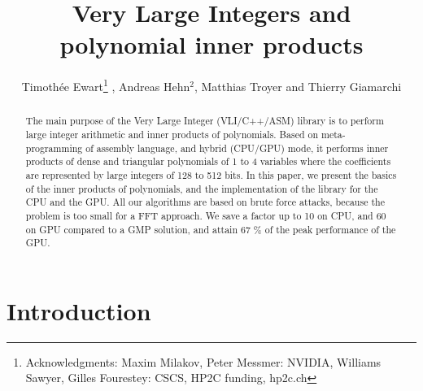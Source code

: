 \documentclass[oribibl]{llncs2e/llncs}
\title{Very Large Integers  and polynomial inner products}
\author{Timoth\'ee Ewart\inst{1}\thanks{Acknowledgments: Maxim Milakov, Peter Messmer:   NVIDIA,   Williams Sawyer, Gilles Fourestey:  CSCS, HP2C funding, hp2c.ch}  , Andreas Hehn$^2$, Matthias Troyer\inst{2} and Thierry Giamarchi\inst{1}}
\institute{Universit\'e de Gen\`eve, \email{timothee.ewart@gmail.com}  \and Eidgen\"ossische Technische Hochschule Z\"urich }
\begin{document}
\maketitle
\begin{abstract}
The main purpose of the  Very Large Integer (VLI/C++/ASM) library is to perform large integer arithmetic and  inner products of polynomials. Based on meta-programming of assembly language,
and  hybrid (CPU/GPU) mode, it performs inner products of dense and triangular polynomials  of 1 to 4 variables  where the coefficients are represented  by large integers of 128 to 512 bits. 
In this paper, we present the basics of the inner products of polynomials, and  the implementation of the library for the CPU and the GPU.  All our algorithms are based on brute force attacks, because the problem is too small for a FFT approach. We save a factor up to 10 on CPU, and 60 on GPU compared to a GMP solution,
and attain 67 \% of the peak performance of the GPU.
\end{abstract}
\section{Introduction}
\end{document}
